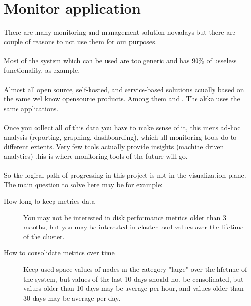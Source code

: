 \section*{Monitor application}

\paragraph{}
There are many monitoring and management solution novadays but there are couple of reasons to not use them for our purposes.

\paragraph{}
Most of the system which can be used are too generic and has 90\% of usseless functionality.
 as example.

\paragraph{}
Almost all open source, self-hosted, and service-based solutions acually based on the same wel know opensource products.
Among them  and .
The akka uses the same applications.

\paragraph{}
Once you collect all of this data you have to make sense of it, this mens ad-hoc analysis (reporting, graphing, dashboarding),
which all monitoring tools do to different extents.
Very few tools actually provide insights (machine driven analytics) this is where monitoring tools of the future will go.

\paragraph{}
So the logical path of progressing in this project is not in the visualization plane.
The main question to solve here may be for example:

\begin{description}
\item[How long to keep metrics data]
You may not be interested in disk performance metrics older than 3 months, but you may be interested in cluster load values over the lifetime of the cluster.
\item[How to consolidate metrics over time]
Keep used space values of nodes in the category "large" over the lifetime of the system, but values of the last 10 days should not be
consolidated, but values older than 10 days may be average per hour, and values older than 30 days may be average per day.
\end{description}

